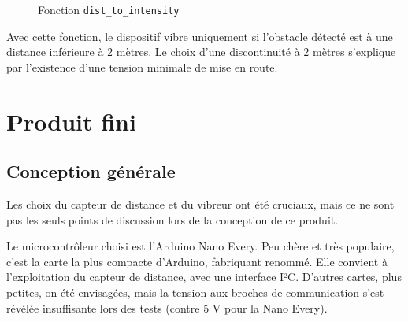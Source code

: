 \documentclass[a4paper, 11pt]{article}
\begin{document}
\begin{figure}[H]
\centering
{}
\caption{Fonction \lstinline+dist_to_intensity+}
\end{figure}

\par Avec cette fonction, le dispositif vibre uniquement si l'obstacle détecté est à une distance inférieure à 2 mètres. Le choix d'une discontinuité à 2 mètres s'explique par l'existence d'une tension minimale de mise en route.




\newpage \section{Produit fini}

\subsection{Conception générale}

\par Les choix du capteur de distance et du vibreur ont été cruciaux, mais ce ne sont pas les seuls points de discussion lors de la conception de ce produit.

\par Le microcontrôleur choisi est l'Arduino Nano Every. Peu chère et très populaire, c'est la carte la plus compacte d'Arduino, fabriquant renommé. Elle convient à l'exploitation du capteur de distance, avec une interface I²C. D'autres cartes, plus petites, on été envisagées, mais la tension aux broches de communication s'est révélée insuffisante lors des tests (contre 5 V pour la Nano Every).
\end{document}
